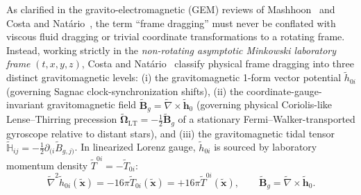 \documentclass[aps,prd,twocolumn,10pt,showkeys,nofootinbib,floatfix,longbibliography]{revtex4-2}
\begin{document}
As clarified in the gravito-electromagnetic (GEM) reviews of Mashhoon~\cite{mashhoon2007} and Costa and Natário~\cite{costa2014grg,costa2021universe}, the term ``frame dragging'' must never be conflated with viscous fluid dragging or trivial coordinate transformations to a rotating frame. Instead, working strictly in the \emph{non-rotating asymptotic Minkowski laboratory frame} $(t, x, y, z)$, Costa and Natário~\cite{costa2021universe} classify physical frame dragging into three distinct gravitomagnetic levels: (i) the gravitomagnetic 1-form vector potential $\tilde{h}_{0i}$ (governing Sagnac clock-synchronization shifts), (ii) the coordinate-gauge-invariant gravitomagnetic field $\tilde{\mathbf{B}}_g = \tilde{\nabla} \times \tilde{\mathbf{h}}_0$ (governing physical Coriolis-like Lense--Thirring precession $\tilde{\boldsymbol{\Omega}}_{\mathrm{LT}} = -\frac{1}{2}\tilde{\mathbf{B}}_g$ of a stationary Fermi--Walker-transported gyroscope relative to distant stars), and (iii) the gravitomagnetic tidal tensor $\tilde{\mathbb{H}}_{ij} = -\frac{1}{2}\partial_{(i}\tilde{B}_{g,j)}$. In linearized Lorenz gauge, $\tilde{h}_{0i}$ is sourced by laboratory momentum density $\tilde{T}^{0i} = -\tilde{T}_{0i}$:
\begin{equation}
\tilde{\nabla}^2 \tilde{h}_{0i}(\tilde{\mathbf{x}}) = -16\pi \tilde{T}_{0i}(\tilde{\mathbf{x}}) = +16\pi \tilde{T}^{0i}(\tilde{\mathbf{x}}), \qquad \tilde{\mathbf{B}}_g = \tilde{\nabla} \times \tilde{\mathbf{h}}_0.
\label{eq:gem_poisson}
\end{equation}
\end{document}

